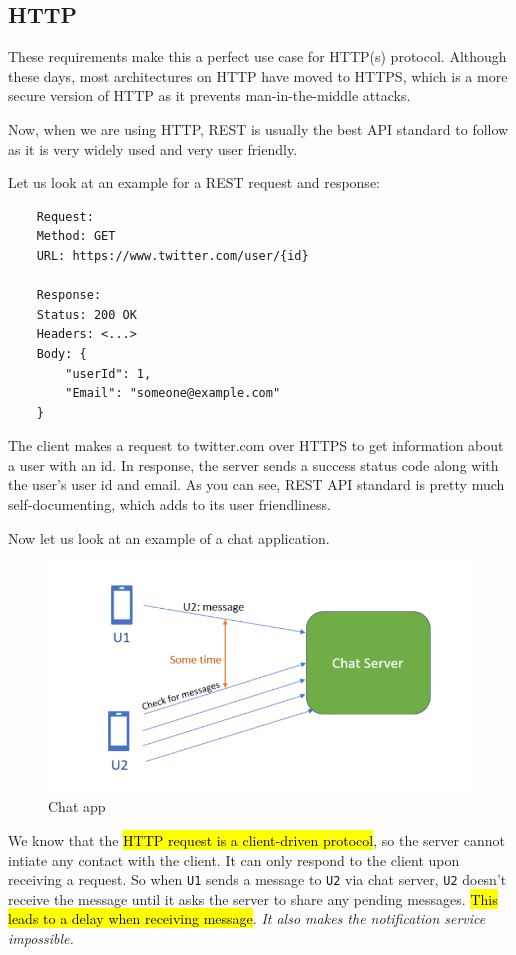\subsection{HTTP}
These requirements make this a perfect use case for HTTP(s) protocol. 
Although these days, most architectures on HTTP have moved to HTTPS, 
which is a more secure version of HTTP as it prevents man-in-the-middle
 attacks.

Now, when we are using HTTP, REST is usually the best API standard to 
follow as it is very widely used and very user friendly.

Let us look at an example for a REST request and response:

\begin{lstlisting}
    Request:
    Method: GET
    URL: https://www.twitter.com/user/{id}
    
    Response:
    Status: 200 OK
    Headers: <...>
    Body: {
        "userId": 1,
        "Email": "someone@example.com"
    }
\end{lstlisting}

The client makes a request to twitter.com over HTTPS to get 
information about a user with an id. In response, the server
sends a success status code along with the user's user id and email. 
As you can see, REST API standard is pretty much self-documenting,
which adds to its user friendliness.

Now let us look at an example of a chat application.

\begin{figure}[h]
\centering
\includegraphics[width=0.8\linewidth]{figures/03_protocols_communication/chat_app.png}
\caption{Chat app}
\label{fig:chat_app}
\end{figure}

We know that the \hl{HTTP request is a client-driven protocol}, so the server
cannot intiate any contact with the client. It can only respond to the client upon
receiving a request. So when \texttt{U1} sends a message to \texttt{U2} via chat
server, \texttt{U2} doesn't receive the message until it asks the server to share 
any pending messages. \hl{This leads to a delay when receiving message}. \textit{It 
also makes the notification service impossible.}

